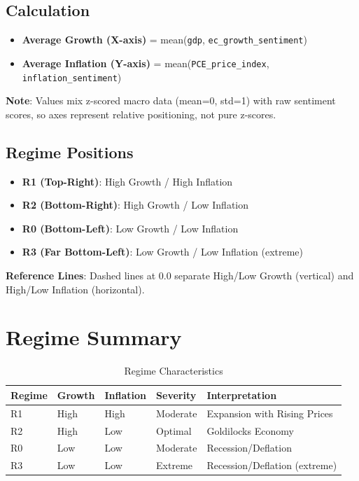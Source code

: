 \documentclass[11pt,a4paper]{article}
\begin{document}
\subsection{Calculation}

\begin{itemize}[leftmargin=*]
    \item \textbf{Average Growth (X-axis)} = mean(\texttt{gdp}, \texttt{ec\_growth\_sentiment})
    \item \textbf{Average Inflation (Y-axis)} = mean(\texttt{PCE\_price\_index}, \texttt{inflation\_sentiment})
\end{itemize}

\textbf{Note}: Values mix z-scored macro data (mean=0, std=1) with raw sentiment scores, so axes represent relative positioning, not pure z-scores.

\subsection{Regime Positions}

\begin{itemize}[leftmargin=*]
    \item \textbf{R1 (Top-Right)}: High Growth / High Inflation
    \item \textbf{R2 (Bottom-Right)}: High Growth / Low Inflation
    \item \textbf{R0 (Bottom-Left)}: Low Growth / Low Inflation
    \item \textbf{R3 (Far Bottom-Left)}: Low Growth / Low Inflation (extreme)
\end{itemize}

\textbf{Reference Lines}: Dashed lines at 0.0 separate High/Low Growth (vertical) and High/Low Inflation (horizontal).

\section{Regime Summary}

\begin{table}[h]
\centering
\small
\begin{tabular}{@{}lllll@{}}
\toprule
\textbf{Regime} & \textbf{Growth} & \textbf{Inflation} & \textbf{Severity} & \textbf{Interpretation} \\
\midrule
R1 & High & High & Moderate & Expansion with Rising Prices \\
R2 & High & Low & Optimal & Goldilocks Economy \\
R0 & Low & Low & Moderate & Recession/Deflation \\
R3 & Low & Low & Extreme & Recession/Deflation (extreme) \\
\bottomrule
\end{tabular}
\caption{Regime Characteristics}
\end{table}
\end{document}
